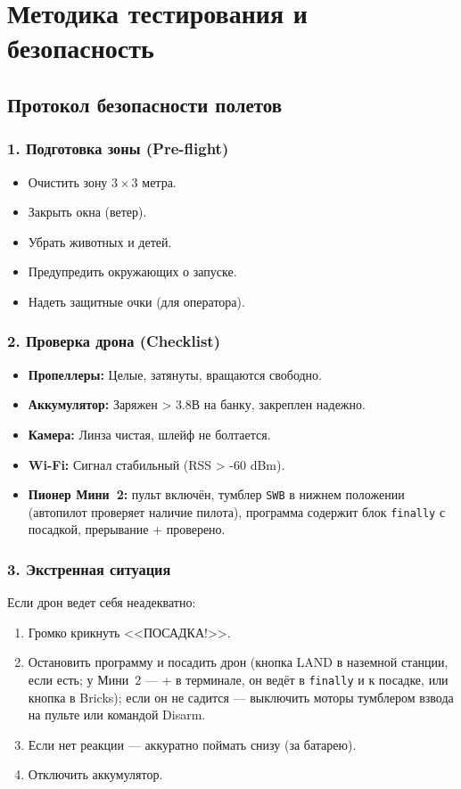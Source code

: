 \section{Методика тестирования и безопасность}

\subsection{Протокол безопасности полетов}

\subsubsection{1. Подготовка зоны (Pre-flight)}
\begin{itemize}
    \item Очистить зону $3 \times 3$ метра.
    \item Закрыть окна (ветер).
    \item Убрать животных и детей.
    \item Предупредить окружающих о запуске.
    \item Надеть защитные очки (для оператора).
\end{itemize}

\subsubsection{2. Проверка дрона (Checklist)}
\begin{itemize}
    \item \textbf{Пропеллеры:} Целые, затянуты, вращаются свободно.
    \item \textbf{Аккумулятор:} Заряжен > 3.8В на банку, закреплен надежно.
    \item \textbf{Камера:} Линза чистая, шлейф не болтается.
    \item \textbf{Wi-Fi:} Сигнал стабильный (RSS > -60 dBm).
    \item \textbf{Пионер Мини~2:} пульт включён, тумблер \texttt{SWB} в нижнем положении (автопилот проверяет наличие пилота), программа содержит блок \texttt{finally} с посадкой, прерывание + проверено.
\end{itemize}

\subsubsection{3. Экстренная ситуация}
Если дрон ведет себя неадекватно:
\begin{enumerate}
    \item Громко крикнуть <<ПОСАДКА!>>.
    \item Остановить программу и посадить дрон (кнопка LAND в наземной станции, если есть; у Мини~2 --- + в терминале, он ведёт в \texttt{finally} и к посадке, или кнопка  в Bricks); если он не садится --- выключить моторы тумблером взвода на пульте или командой Disarm.
    \item Если нет реакции — аккуратно поймать снизу (за батарею).
    \item Отключить аккумулятор.
\end{enumerate}

